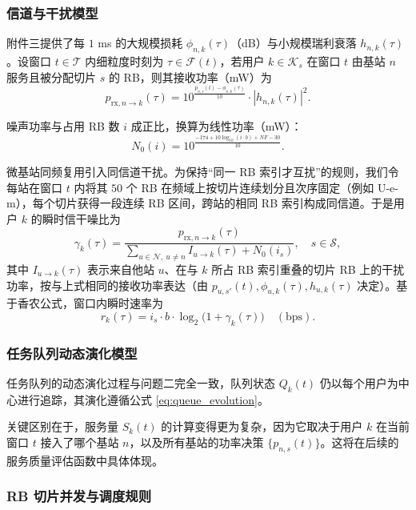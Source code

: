 \subsubsection{信道与干扰模型}

附件三提供了每 $1$ ms 的大规模损耗 $\phi_{n,k}(\tau)$（dB）与小规模瑞利衰落 $h_{n,k}(\tau)$。设窗口 $t\in\mathcal{T}$ 内细粒度时刻为 $\tau\in\mathcal{F}(t)$，若用户 $k\in\mathcal{K}_s$ 在窗口 $t$ 由基站 $n$ 服务且被分配切片 $s$ 的 RB，则其接收功率（mW）为
\begin{equation}
 p_{\mathrm{rx},n\to k}(\tau)=10^{\frac{p_{n,s}(t)-\phi_{n,k}(\tau)}{10}}\cdot |h_{n,k}(\tau)|^2.
\end{equation}

噪声功率与占用 RB 数 $i$ 成正比，换算为线性功率（mW）：
\begin{equation}
 N_0(i)=10^{\frac{-174+10\log_{10}(i\cdot b)+NF-30}{10}}.
\end{equation}

微基站同频复用引入同信道干扰。为保持“同一 RB 索引才互扰”的规则，我们令每站在窗口 $t$ 内将其 $50$ 个 RB 在频域上按切片连续划分且次序固定（例如 U-e-m），每个切片获得一段连续 RB 区间，跨站的相同 RB 索引构成同信道。于是用户 $k$ 的瞬时信干噪比为
\begin{equation}
 \gamma_k(\tau)=\frac{p_{\mathrm{rx},n\to k}(\tau)}{\sum\limits_{u\in\mathcal{N},\ u\neq n} I_{u\to k}(\tau)+N_0(i_s)},\quad s\in\mathcal{S},
\end{equation}
其中 $I_{u\to k}(\tau)$ 表示来自他站 $u$、在与 $k$ 所占 RB 索引重叠的切片 RB 上的干扰功率，按与上式相同的接收功率表达（由 $p_{u,s'}(t),\phi_{u,k}(\tau),h_{u,k}(\tau)$ 决定）。基于香农公式，窗口内瞬时速率为
\begin{equation}
 r_k(\tau)=i_s\cdot b\cdot \log_2\big(1+\gamma_k(\tau)\big)\quad(\mathrm{bps}).
\end{equation}
\subsubsection{任务队列动态演化模型}

任务队列的动态演化过程与问题二完全一致，队列状态 $Q_k(t)$ 仍以每个用户为中心进行追踪，其演化遵循公式 \eqref{eq:queue_evolution}。

关键区别在于，服务量 $S_k(t)$ 的计算变得更为复杂，因为它取决于用户 $k$ 在当前窗口 $t$ 接入了哪个基站 $n$，以及所有基站的功率决策 $\{p_{n,s}(t)\}$。这将在后续的服务质量评估函数中具体体现。


\subsubsection{RB 切片并发与调度规则}

